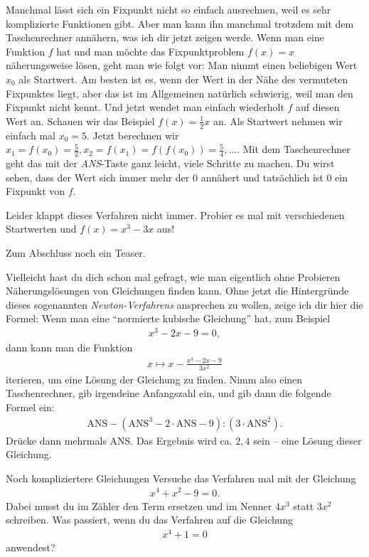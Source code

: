 \documentclass[a4paper,ngerman,12pt]{zirkelblatt1415}
\theoremstyle{definition}
\theoremstyle{remark}
\begin{document}
Manchmal lässt sich ein Fixpunkt nicht so einfach ausrechnen, weil es sehr komplizierte Funktionen gibt.
Aber man kann ihn manchmal trotzdem mit dem Taschenrechner annähern, was ich dir jetzt zeigen werde.
Wenn man eine Funktion $f$ hat und man möchte das Fixpunktproblem $f(x) = x$ näherungsweise lösen, geht man wie folgt vor:
Man nimmt einen beliebigen Wert $x_0$ als Startwert. Am besten ist es, wenn der Wert in der Nähe des vermuteten Fixpunktes liegt,
aber das ist im Allgemeinen natürlich schwierig, weil man den Fixpunkt nicht kennt.
Und jetzt wendet man einfach wiederholt $f$ auf diesen Wert an.
Schauen wir das Beispiel $f(x) = \frac{1}{2}x  $ an.
Als Startwert nehmen wir einfach mal $x_0 = 5$.
Jetzt berechnen wir $x_1 = f(x_0) = \frac{5}{2} , x_2 = f(x_1) = f(f(x_0))= \frac{5}{4}, \ldots$.
Mit dem Taschenrechner geht das mit der \emph{ANS}-Taste ganz leicht, viele Schritte zu machen.
Du wirst sehen, dass der Wert sich immer mehr der $0$ annähert und tatsächlich ist $0$ ein Fixpunkt von $f$.

Leider klappt dieses Verfahren nicht immer.
Probier es mal mit verschiedenen Startwerten und $f(x) =  x^3 - 3x$ aus!

Zum Abschluss noch ein Teaser.

Vielleicht hast du dich schon mal gefragt, wie man eigentlich ohne Probieren Näherungslösungen von Gleichungen 
finden kann. Ohne jetzt die Hintergründe dieses sogenannten \emph{Newton-Verfahrens} ansprechen zu wollen, zeige ich dir hier die Formel:
Wenn man eine "`normierte kubische Gleichung"' hat, zum Beispiel 
\begin{align*}
 x^3 - 2x - 9 = 0,
\end{align*}
dann kann man die Funktion 
\begin{align*}
 x \mapsto x - \frac{x^3-2x-9}{3x^2}
\end{align*}
iterieren, um eine Lösung der Gleichung zu finden.
Nimm also einen Taschenrechner, gib irgendeine Anfangszahl ein, und gib dann die folgende Formel ein:
\begin{align*}
 \text{ANS} - (\text{ANS}^3 - 2 \cdot \text{ANS} -9) : (3 \cdot \text{ANS}^2). 
\end{align*}
Drücke dann mehrmals ANS. Das Ergebnis wird ca. $2,4$ sein -- eine Lösung dieser Gleichung.

\begin{aufgabe}{Noch kompliziertere Gleichungen}
 Versuche das Verfahren mal mit der Gleichung 
 \begin{align*}
  x^4 + x^2 - 9 = 0.
 \end{align*}
 Dabei musst du im Zähler den Term ersetzen und im Nenner $4x^3$ statt $3x^2$ schreiben.
 Was passiert, wenn du das Verfahren auf die Gleichung 
 \begin{align*}
  x^4 + 1 = 0
 \end{align*}
anwendest?
\end{aufgabe}
\end{document}
